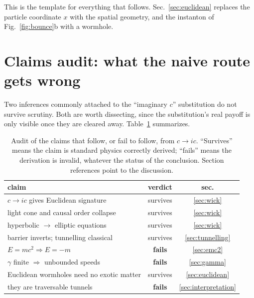 \documentclass[twocolumn,floatfix,aps,prd,nofootinbib]{revtex4-2}
\begin{document}
This is the template for everything that follows. Sec.~\ref{sec:euclidean} replaces the particle coordinate $x$ with the spatial geometry, and the instanton of Fig.~\ref{fig:bounce}b with a wormhole.

\section{Claims audit: what the naive route gets wrong}
\label{sec:audit}

Two inferences commonly attached to the ``imaginary $c$'' substitution do not survive scrutiny. Both are worth dissecting, since the substitution's real payoff is only visible once they are cleared away. Table~\ref{tab:audit} summarizes.

\begin{table}[t]
\caption{Audit of the claims that follow, or fail to follow, from $c\to ic$. ``Survives'' means the claim is standard physics correctly derived; ``fails'' means the derivation is invalid, whatever the status of the conclusion. Section references point to the discussion.}
\label{tab:audit}
\begin{ruledtabular}
\begin{tabular}{lcc}
claim & verdict & sec. \\
\hline
$c\to ic$ gives Euclidean signature & survives & \ref{sec:wick} \\
light cone and causal order collapse & survives & \ref{sec:wick} \\
hyperbolic $\to$ elliptic equations & survives & \ref{sec:wick} \\
barrier inverts; tunnelling classical & survives & \ref{sec:tunnelling} \\
$E=mc^2\Rightarrow E=-m$ & \textbf{fails} & \ref{sec:emc2} \\
$\gamma$ finite $\Rightarrow$ unbounded speeds & \textbf{fails} & \ref{sec:gamma} \\
Euclidean wormholes need no exotic matter & survives\footnotemark[1] & \ref{sec:euclidean} \\
they are traversable tunnels & \textbf{fails} & \ref{sec:interpretation} \\
\end{tabular}
\end{ruledtabular}
\end{table}
\end{document}
